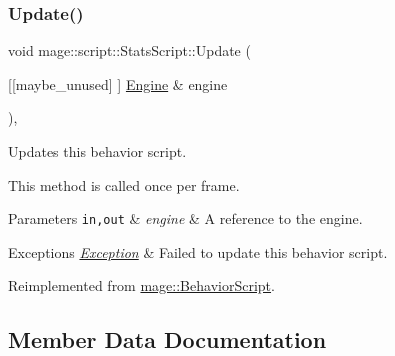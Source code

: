 \mbox{\label{classmage_1_1script_1_1_stats_script_aad8c3b8fb846d47605b1f1d14f1ea157}} 
\subsubsection{\texorpdfstring{Update()}{Update()}}
{\footnotesize\ttfamily void mage\+::script\+::\+Stats\+Script\+::\+Update (\begin{DoxyParamCaption}\item[{\mbox{[}\mbox{[}maybe\+\_\+unused\mbox{]} \mbox{]} \mbox{\hyperlink{classmage_1_1_engine}{Engine}} \&}]{engine }\end{DoxyParamCaption})\hspace{0.3cm}{\ttfamily [override]}, {\ttfamily [virtual]}}

Updates this behavior script.

This method is called once per frame.


\begin{DoxyParams}[1]{Parameters}
\mbox{\tt in,out}  & {\em engine} & A reference to the engine. \\
\hline
\end{DoxyParams}

\begin{DoxyExceptions}{Exceptions}
{\em \mbox{\hyperlink{classmage_1_1_exception}{Exception}}} & Failed to update this behavior script. \\
\hline
\end{DoxyExceptions}


Reimplemented from \mbox{\hyperlink{classmage_1_1_behavior_script_a085634661326b59850c1111e537baa4e}{mage\+::\+Behavior\+Script}}.



\subsection{Member Data Documentation}
\mbox{\label{classmage_1_1script_1_1_stats_script_a7ef910aceb585af53110697ea5b3f810}} 
